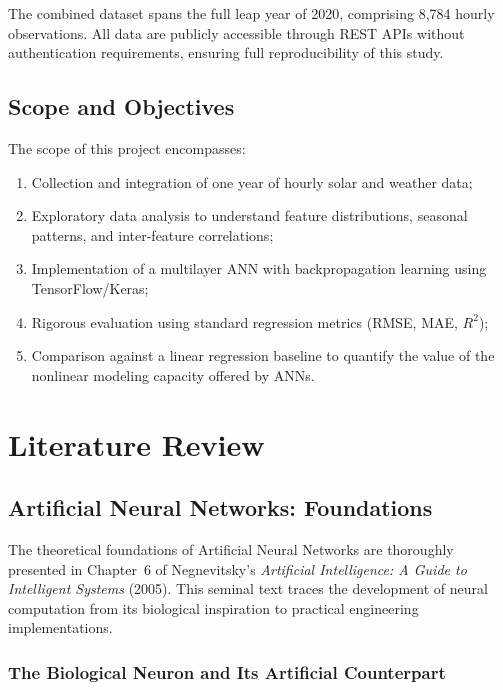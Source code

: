 \documentclass[11pt, a4paper]{article}
\begin{document}
The combined dataset spans the full leap year of 2020, comprising 8,784 hourly
observations. All data are publicly accessible through REST APIs without
authentication requirements, ensuring full reproducibility of this study.

\subsection{Scope and Objectives}

The scope of this project encompasses:

\begin{enumerate}
    \item Collection and integration of one year of hourly solar and weather data;
    \item Exploratory data analysis to understand feature distributions, seasonal
    patterns, and inter-feature correlations;
    \item Implementation of a multilayer ANN with backpropagation learning using
    TensorFlow/Keras;
    \item Rigorous evaluation using standard regression metrics (RMSE, MAE, $R^2$);
    \item Comparison against a linear regression baseline to quantify the value of
    the nonlinear modeling capacity offered by ANNs.
\end{enumerate}

\section{Literature Review}\label{sec:litreview}

\subsection{Artificial Neural Networks: Foundations}

The theoretical foundations of Artificial Neural Networks are thoroughly presented
in Chapter~6 of Negnevitsky's \textit{Artificial Intelligence: A Guide to Intelligent
Systems} (2005). This seminal text traces the development of neural computation
from its biological inspiration to practical engineering implementations.

\subsubsection{The Biological Neuron and Its Artificial Counterpart}
\end{document}
